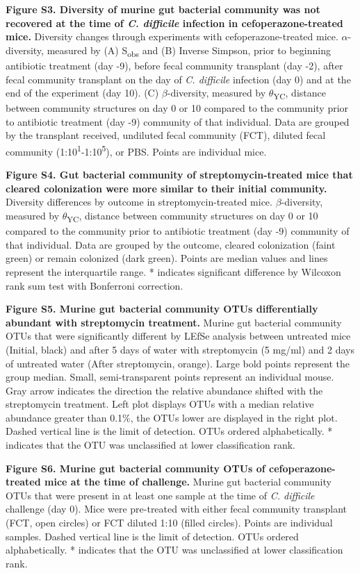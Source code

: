 \documentclass[
  12pt,
]{article}
\begin{document}
\textbf{Figure S3. Diversity of murine gut bacterial community was not
recovered at the time of \emph{C. difficile} infection in
cefoperazone-treated mice.} Diversity changes through experiments with
cefoperazone-treated mice. \(\alpha\)-diversity, measured by (A)
S\textsubscript{obs} and (B) Inverse Simpson, prior to beginning
antibiotic treatment (day -9), before fecal community transplant (day
-2), after fecal community transplant on the day of \emph{C. difficile}
infection (day 0) and at the end of the experiment (day 10). (C)
\(\beta\)-diversity, measured by \(\theta\)\textsubscript{YC}, distance
between community structures on day 0 or 10 compared to the community
prior to antibiotic treatment (day -9) community of that individual.
Data are grouped by the transplant received, undiluted fecal community
(FCT), diluted fecal community
(1:10\textsuperscript{1}-1:10\textsuperscript{5}), or PBS. Points are
individual mice.

\hfill\break

\textbf{Figure S4. Gut bacterial community of streptomycin-treated mice
that cleared colonization were more similar to their initial community.}
Diversity differences by outcome in streptomycin-treated mice.
\(\beta\)-diversity, measured by \(\theta\)\textsubscript{YC}, distance
between community structures on day 0 or 10 compared to the community
prior to antibiotic treatment (day -9) community of that individual.
Data are grouped by the outcome, cleared colonization (faint green) or
remain colonized (dark green). Points are median values and lines
represent the interquartile range. * indicates significant difference by
Wilcoxon rank sum test with Bonferroni correction.

\hfill\break

\textbf{Figure S5. Murine gut bacterial community OTUs differentially
abundant with streptomycin treatment.} Murine gut bacterial community
OTUs that were significantly different by LEfSe analysis between
untreated mice (Initial, black) and after 5 days of water with
streptomycin (5 mg/ml) and 2 days of untreated water (After
streptomycin, orange). Large bold points represent the group median.
Small, semi-transparent points represent an individual mouse. Gray arrow
indicates the direction the relative abundance shifted with the
streptomycin treatment. Left plot displays OTUs with a median relative
abundance greater than 0.1\%, the OTUs lower are displayed in the right
plot. Dashed vertical line is the limit of detection. OTUs ordered
alphabetically. * indicates that the OTU was unclassified at lower
classification rank.

\hfill\break

\textbf{Figure S6. Murine gut bacterial community OTUs of
cefoperazone-treated mice at the time of challenge.} Murine gut
bacterial community OTUs that were present in at least one sample at the
time of \emph{C. difficile} challenge (day 0). Mice were pre-treated
with either fecal community transplant (FCT, open circles) or FCT
diluted 1:10 (filled circles). Points are individual samples. Dashed
vertical line is the limit of detection. OTUs ordered alphabetically. *
indicates that the OTU was unclassified at lower classification rank.
\end{document}
